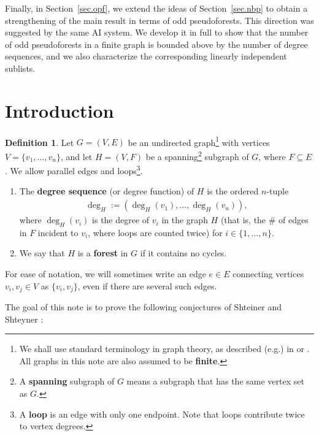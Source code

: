 \documentclass[12pt]{article}
\theoremstyle{definition}
\newtheorem{definition}[theorem]{Definition}
\theoremstyle{remark}
\begin{document}
Finally, in Section~\ref{sec.opf}, we extend the ideas of Section~\ref{sec.nbp} to obtain a strengthening of the main result in terms of odd pseudoforests. This direction was suggested by the same AI system. We develop it in full to show that the number of odd pseudoforests in a finite graph is bounded above by the number of degree sequences, and we also characterize the corresponding linearly independent sublists.





\section{Introduction}\label{sec:intro} 


\begin{definition}\label{firstdef}
    Let $G=(V,E)$ be an undirected graph\footnote{We shall use standard terminology in graph theory, as described (e.g.) in \cite{BondyMurty} or \cite{Ruohonen}. All graphs in this note are also assumed to be \textbf{finite}.} with vertices $V = \{v_1,\ldots,v_n\}$, and let $H=(V,F)$ be a spanning\footnote{A \textbf{spanning} subgraph of $G$ means a subgraph that has the same vertex set as $G$.} subgraph of $G$, where $F \subseteq E$. We allow parallel edges and loops\footnote{A \textbf{loop} is an edge with only one endpoint. Note that loops contribute twice to vertex degrees.}.
    \begin{enumerate}
        \item The \textbf{degree sequence} (or degree function) of $H$ is the ordered $n$-tuple \begin{align*}
            \deg_H := (\deg_H(v_1),\ldots,\deg_H(v_n)),
        \end{align*} where $\deg_H(v_i)$ is the degree of $v_i$ in the graph $H$ (that is, the \#  of edges in $F$ incident to $v_i$, where loops are counted twice) for $i \in \{1,\ldots,n\}$.
        \item We say that $H$ is a \textbf{forest} in $G$ if it contains no cycles.
    \end{enumerate}
	For ease of notation, we will sometimes write an edge $e \in E$ connecting vertices $v_i,v_j \in V$ as $\{v_i,v_j\}$, even if there are several such edges.
\end{definition}

The goal of this note is to prove the following conjectures of Shteiner and Shteyner \cite[Hypothesis~2]{shteiner2025comparingnumberssubforestssubgraphdegreetuples}:
\end{document}
